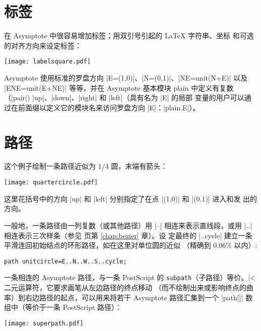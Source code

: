 \documentclass[nofonts,CJKnormalspaces]{ctexbook}[2009/05/20]
\newcommand*\prgname[1]{\textsf{#1}}
\begin{document}
\section{标签}

在 \prgname{Asymptote} 中很容易增加标签；用双引号引起的 \LaTeX{} 字符串、坐标
和可选的对齐方向来设定标签：

\begin{center}
  \texttt{[image: labelsquare.pdf]}
\end{center}

\prgname{Asymptote} 使用标准的罗盘方向 |E=(1,0)|、|N=(0,1)|、|NE=unit(N+E)|
以及 |ENE=unit(E+NE)| 等等，并在 \prgname{Asymptote} 基本模块 \prgname{plain}
中定义有复数（|pair|) |up|、|down|、|right| 和 |left|（具有名为 |E| 的局部
变量的用户可以通过在前面缀以定义它的模块名来访问罗盘方向 |E|：|plain.E|）。

\section{路径}

这个例子绘制一条路径近似为 $1/4$ 圆，末端有箭头：

\begin{center}
  \texttt{[image: quartercircle.pdf]}
\end{center}
这里花括号中的方向 |up| 和 |left| 分别指定了在点 |(1,0)| 和 |(0,1)| 进入和发
出的方向。

一般地，一条路径由一列复数（或其他路径）用 |--| 相连来表示直线段，或用 |..|
相连表示三次样条（参见 \pageref{chap:bezier} 页第 \ref{chap:bezier} 章）。设
定最终的 |..cycle| 建立一条平滑连回初始结点的环形路径，如在这里对单位圆的近似
（精确到 $0.06\%$ 以内）:
\begin{lstlisting}
path unitcircle=E..N..W..S..cycle;
\end{lstlisting}

一条相连的 \prgname{Asymptote} 路径，与一条 \prgname{PostScript} 的
\verb=subpath=（子路径）等价。|^^| 二元运算符，它要求画笔从左边路径的终点移动
（而不绘制出来或影响终点的曲率）到右边路径的起点，可以用来将若干
\prgname{Asymptote} 路径汇集到一个 |path[]| 数组中（等价于一条
\prgname{PostScript} 路径）：

\begin{center}
  \texttt{[image: superpath.pdf]}
\end{center}
\end{document}
